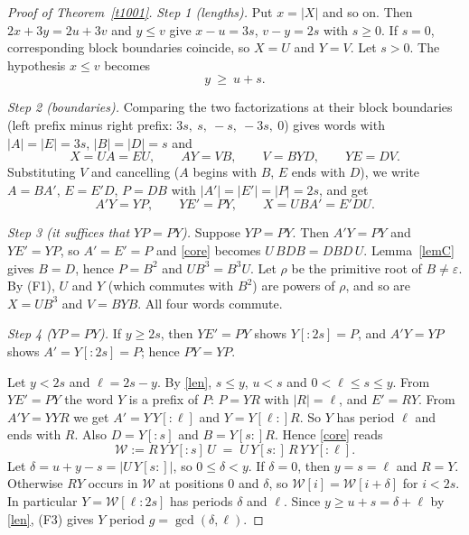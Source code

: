 \documentclass[11pt]{article}
\newcommand{\eps}{\varepsilon}
\theoremstyle{remark}\newtheorem*{remark}{Remark}
\begin{document}
\begin{proof}[Proof of Theorem~\ref{t1001}]
\emph{Step 1 (lengths).} Put \(x=|X|\) and so on. Then \(2x+3y=2u+3v\) and \(y\le v\) give \(x-u=3s\), \(v-y=2s\) with \(s\ge0\). If \(s=0\), corresponding block boundaries coincide, so \(X=U\) and \(Y=V\). Let \(s>0\). The hypothesis \(x\le v\) becomes
\begin{equation}\label{len}
 y\ \ge\ u+s .
\end{equation}

\emph{Step 2 (boundaries).} Comparing the two factorizations at their block boundaries (left prefix minus right prefix: \(3s,\ s,\ -s,\ -3s,\ 0\)) gives words with \(|A|=|E|=3s\), \(|B|=|D|=s\) and
\[
 X=UA=EU,\qquad AY=VB,\qquad V=BYD,\qquad YE=DV .
\]
Substituting \(V\) and cancelling (\(A\) begins with \(B\), \(E\) ends with \(D\)), we write \(A=BA'\), \(E=E'D\), \(P=DB\) with \(|A'|=|E'|=|P|=2s\), and get
\begin{equation}\label{core}
 A'Y=YP,\qquad YE'=PY,\qquad X=UBA'=E'DU .
\end{equation}

\emph{Step 3 (it suffices that \(YP=PY\)).} Suppose \(YP=PY\). Then \(A'Y=PY\) and \(YE'=YP\), so \(A'=E'=P\) and \eqref{core} becomes \(U\,BDB=DBD\,U\). Lemma~\ref{lemC} gives \(B=D\), hence \(P=B^2\) and \(UB^3=B^3U\). Let \(\rho\) be the primitive root of \(B\ne\eps\). By (F1), \(U\) and \(Y\) (which commutes with \(B^2\)) are powers of \(\rho\), and so are \(X=UB^3\) and \(V=BYB\). All four words commute.

\emph{Step 4 (\(YP=PY\)).} If \(y\ge2s\), then \(YE'=PY\) shows \(Y[{:}2s]=P\), and \(A'Y=YP\) shows \(A'=Y[{:}2s]=P\); hence \(PY=YP\).

Let \(y<2s\) and \(\ell=2s-y\). By \eqref{len}, \(s\le y\), \(u<s\) and \(0<\ell\le s\le y\). From \(YE'=PY\) the word \(Y\) is a prefix of \(P\): \(P=YR\) with \(|R|=\ell\), and \(E'=RY\). From \(A'Y=YYR\) we get \(A'=Y\,Y[{:}\ell]\) and \(Y=Y[\ell{:}]R\). So \(Y\) has period \(\ell\) and ends with \(R\). Also \(D=Y[{:}s]\) and \(B=Y[s{:}]R\). Hence \eqref{core} reads
\[
 \mathcal W:=R\,Y\,Y[{:}s]\,U\;=\;U\,Y[s{:}]\,R\,Y\,Y[{:}\ell].
\]
Let \(\delta=u+y-s=|U\,Y[s{:}]|\), so \(0\le\delta<y\). If \(\delta=0\), then \(y=s=\ell\) and \(R=Y\). Otherwise \(RY\) occurs in \(\mathcal W\) at positions \(0\) and \(\delta\), so \(\mathcal W[i]=\mathcal W[i+\delta]\) for \(i<2s\). In particular \(Y=\mathcal W[\ell{:}2s]\) has periods \(\delta\) and \(\ell\). Since \(y\ge u+s=\delta+\ell\) by \eqref{len}, (F3) gives \(Y\) period \(g=\gcd(\delta,\ell)\).


\end{proof}
\end{document}
